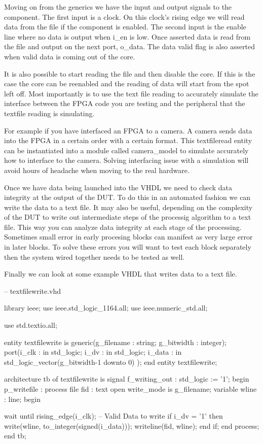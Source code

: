 Moving on from the generics we have the input and output signals to the component. The first input is a clock. On this clock's rising edge we will read data from the file if the component is enabled. The second input is the enable line where no data is output when i\_en is low. Once asserted data is read from the file and output on the next port, o\_data. The data valid flag is also asserted when valid data is coming out of the core. 

It is also possible to start reading the file and then disable the core. If this is the case the core can be reenabled and the reading of data will start from the spot left off. Most importantly is to use the text file reading to accurately simulate the interface between the \ac{FPGA} code you are testing and the peripheral that the textfile reading is simulating.

For example if you have interfaced an \ac{FPGA} to a camera. A camera sends data into the \ac{FPGA} in a certain order with a certain format. This textfileread entity can be instantiated into a module called camera\_model to simulate accurately how to interface to the camera. Solving interfacing issue with a simulation will avoid hours of headache when moving to the real hardware. 

Once we have data being launched into the \ac{VHDL} we need to check data integrity at the output of the \ac{DUT}. To do this in an automated fashion we can write the data to a text file. It may also be useful, depending on the complexity of the \ac{DUT} to write out intermediate steps of the processig algorithm to a text file. This way you can analyze data integrity at each stage of the processing. Sometimes small error in early procesing blocks can manifest as very large error in later blocks. To solve these errors you will want to test each block separately then the system wired together needs to be tested as well. 

Finally we can look at some example \ac{VHDL} that writes data to a text file. 

\begin{VHDLlisting}[tabsize=8]
-- textfilewrite.vhd

library	ieee;
	use ieee.std_logic_1164.all;
	use ieee.numeric_std.all;
	
	use std.textio.all;
	
entity textfilewrite is 
	generic(g_filename : string;
	        g_bitwidth : integer);
	port(i_clk      : in    std_logic;
		 i_dv       : in    std_logic;
		 i_data     : in    std_logic_vector(g_bitwidth-1 downto 0)
	);
end entity textfilewrite;

architecture tb of textfilewrite is
	signal f_writing_out : std_logic := '1';
begin
	p_writefile : process
		file fid  : text open write_mode is g_filename;
		variable wline : line;
	begin
		
		wait until rising_edge(i_clk);
		-- Valid Data to write
		if i_dv = '1' then
			write(wline, to_integer(signed(i_data)));
			writeline(fid, wline);
		end if;
	end process;
end tb;
\end{VHDLlisting}

